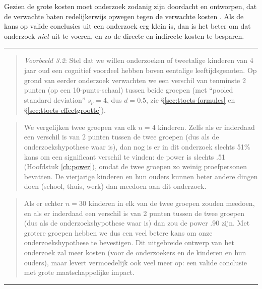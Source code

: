 \documentclass[
]{book}
\begin{document}
Gezien de grote kosten moet onderzoek zodanig zijn doordacht en
ontworpen, dat de verwachte baten redelijkerwijs opwegen tegen de
verwachte kosten \citep[Ch.3]{Rose08}. Als de kans op valide conclusies uit
een onderzoek erg klein is, dan is het beter om dat onderzoek \emph{niet} uit
te voeren, en zo de directe en indirecte kosten te besparen.

\begin{center}\rule{0.5\linewidth}{0.5pt}\end{center}

\begin{quote}
\emph{Voorbeeld 3.2}:
Stel dat we willen onderzoeken of tweetalige kinderen van 4 jaar oud een
cognitief voordeel hebben boven eentalige leeftijdsgenoten. Op grond van
eerder onderzoek verwachten we een verschil van tenminste 2 punten (op
een 10-punts-schaal) tussen beide groepen (met ``pooled standard
deviation'' \(s_p=4\), dus \(d=0.5\), zie
§\ref{sec:ttoets-formules} en §\ref{sec:ttoets-effectgrootte}).
\end{quote}

\begin{quote}
We vergelijken twee groepen van
elk \(n=4\) kinderen. Zelfs als er inderdaad een verschil is van 2 punten
tussen de twee groepen (dus als de onderzoekshypothese waar is), dan nog
is er in dit onderzoek slechts 51\% kans om een significant verschil te
vinden: de power is slechts .51
(Hoofdstuk \ref{ch:power}),
omdat de twee groepen zo weinig proefpersonen
bevatten. De vierjarige kinderen en hun ouders kunnen beter andere
dingen doen (school, thuis, werk) dan meedoen aan dit onderzoek.
\end{quote}

\begin{quote}
Als er echter \(n=30\) kinderen in elk van de twee groepen zouden meedoen,
en als er inderdaad een verschil is van 2 punten tussen de twee groepen
(dus als de onderzoekshypothese waar is) dan zou de power .90 zijn. Met
grotere groepen hebben we dus een veel betere kans om onze
onderzoekshypothese te bevestigen. Dit uitgebreide ontwerp van het
onderzoek zal meer kosten (voor de onderzoekers en de kinderen en hun
ouders), maar levert vermoedelijk ook veel meer op: een valide conclusie
met grote maatschappelijke impact.
\end{quote}

\begin{center}\rule{0.5\linewidth}{0.5pt}\end{center}
\end{document}
